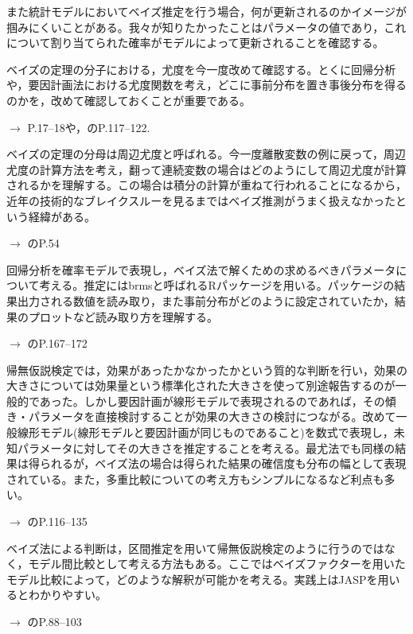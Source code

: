 


また統計モデルにおいてベイズ推定を行う場合，何が更新されるのかイメージが掴みにくいことがある。我々が知りたかったことはパラメータの値であり，これについて割り当てられた確率がモデルによって更新されることを確認する。


\item[尤度] ベイズの定理の分子における，尤度を今一度改めて確認する。とくに回帰分析や，要因計画法における尤度関数を考え，どこに事前分布を置き事後分布を得るのかを，改めて確認しておくことが重要である。
\begin{flushright}
	$\to$ \citet{Toyoda201606}P.17--18や，\citet{kosugi2018}のP.117--122.
\end{flushright}

\item[周辺尤度]ベイズの定理の分母は周辺尤度と呼ばれる。今一度離散変数の例に戻って，周辺尤度の計算方法を考え，翻って連続変数の場合はどのようにして周辺尤度が計算されるかを理解する。この場合は積分の計算が重ねて行われることになるから，近年の技術的なブレイクスルーを見るまではベイズ推測がうまく扱えなかったという経緯がある。
\begin{flushright}
	$\to$ \citet{Baba201907}のP.54
\end{flushright}


\item[回帰分析と尤度]回帰分析を確率モデルで表現し，ベイズ法で解くための求めるべきパラメータについて考える。推定にはbrmsと呼ばれるRパッケージを用いる。パッケージの結果出力される数値を読み取り，また事前分布がどのように設定されていたか，結果のプロットなど読み取り方を理解する。
\begin{flushright}
	$\to$ \citet{Baba201907}のP.167--172
\end{flushright}


\item[要因計画と推定]帰無仮説検定では，効果があったかなかったかという質的な判断を行い，効果の大きさについては効果量という標準化された大きさを使って別途報告するのが一般的であった。しかし要因計画が線形モデルで表現されるのであれば，その傾き・パラメータを直接検討することが効果の大きさの検討につながる。改めて一般線形モデル(線形モデルと要因計画が同じものであること)を数式で表現し，未知パラメータに対してその大きさを推定することを考える。最尤法でも同様の結果は得られるが，ベイズ法の場合は得られた結果の確信度も分布の幅として表現されている。また，多重比較についての考え方もシンプルになるなど利点も多い。
\begin{flushright}
	$\to$ \citet{Toyoda201606}のP.116--135
\end{flushright}


\item[ベイズ法による判断]ベイズ法による判断は，区間推定を用いて帰無仮説検定のように行うのではなく，モデル間比較として考える方法もある。ここではベイズファクターを用いたモデル比較によって，どのような解釈が可能かを考える。実践上はJASPを用いるとわかりやすい。
\begin{flushright}
	$\to$ \citet{Lee201709}のP.88--103
\end{flushright}
